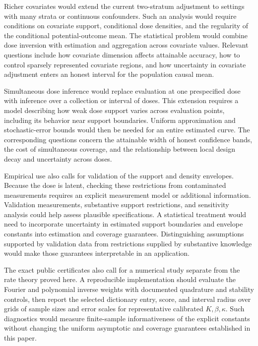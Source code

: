 Richer covariates would extend the current two-stratum adjustment to settings with many strata or continuous confounders. Such an analysis would require conditions on covariate support, conditional dose densities, and the regularity of the conditional potential-outcome mean. The statistical problem would combine dose inversion with estimation and aggregation across covariate values. Relevant questions include how covariate dimension affects attainable accuracy, how to control sparsely represented covariate regions, and how uncertainty in covariate adjustment enters an honest interval for the population causal mean.

Simultaneous dose inference would replace evaluation at one prespecified dose with inference over a collection or interval of doses. This extension requires a model describing how weak dose support varies across evaluation points, including its behavior near support boundaries. Uniform approximation and stochastic-error bounds would then be needed for an entire estimated curve. The corresponding questions concern the attainable width of honest confidence bands, the cost of simultaneous coverage, and the relationship between local design decay and uncertainty across doses.

Empirical use also calls for validation of the support and density envelopes. Because the dose is latent, checking these restrictions from contaminated measurements requires an explicit measurement model or additional information. Validation measurements, substantive support restrictions, and sensitivity analysis could help assess plausible specifications. A statistical treatment would need to incorporate uncertainty in estimated support boundaries and envelope constants into estimation and coverage guarantees. Distinguishing assumptions supported by validation data from restrictions supplied by substantive knowledge would make those guarantees interpretable in an application.

The exact public certificates also call for a numerical study separate from the rate theory proved here. A reproducible implementation should evaluate the Fourier and polynomial inverse weights with documented quadrature and stability controls, then report the selected dictionary entry, score, and interval radius over grids of sample sizes and error scales for representative calibrated \(K,\beta,\kappa\). Such diagnostics would measure finite-sample informativeness of the explicit constants without changing the uniform asymptotic and coverage guarantees established in this paper.

